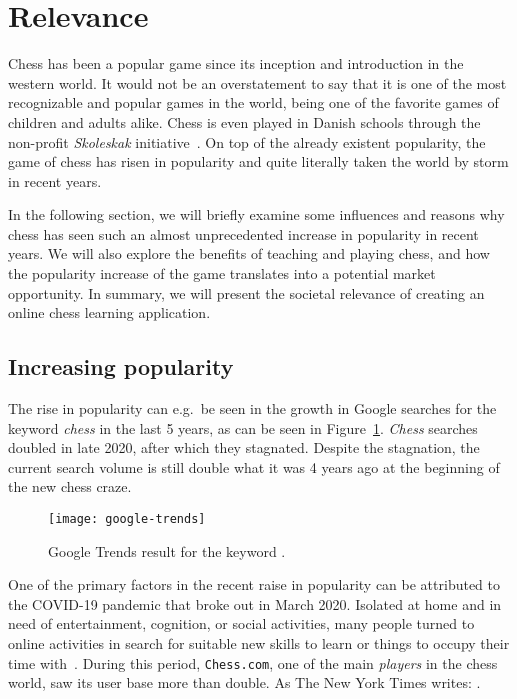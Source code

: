 \section{Relevance}\label{sec:relevance}

Chess has been a popular game since its inception and introduction in the western world.
It would not be an overstatement to say that it is one of the most recognizable and popular games in the world, being
one of the favorite games of children and adults alike.
Chess is even played in Danish schools through the non-profit \textit{Skoleskak} initiative~\cite{skoleskak2024}.
On top of the already existent popularity, the game of chess has risen in popularity and quite literally taken
the world by storm in recent years.

In the following section, we will briefly examine some influences and reasons why chess has seen such an almost
unprecedented increase in popularity in recent years.
We will also explore the benefits of teaching and playing chess, and how the popularity increase of the game translates
into a potential market opportunity.
In summary, we will present the societal relevance of creating an online chess learning application.

\subsection{Increasing popularity}\label{subsec:increasing-popularity}

The rise in popularity can e.g.\ be seen in the growth in Google searches for the keyword \textit{chess} in the last 5
years, as can be seen in Figure~\ref{fig:google-trends}.
\textit{Chess} searches doubled in late 2020, after which they stagnated.
Despite the stagnation, the current search volume is still double what it was 4 years ago at the beginning of the new
chess craze.

\begin{figure}
    \centering
    \texttt{[image: google-trends]}
    \caption{Google Trends result for the keyword .}\label{fig:google-trends}
\end{figure}

One of the primary factors in the recent raise in popularity can be attributed to the COVID-19 pandemic that broke out
in March 2020.
Isolated at home and in need of entertainment, cognition, or social activities, many people turned to online activities
in search for suitable new skills to learn or things to occupy their time with~\cite{nyt2022}.
During this period, \verb|Chess.com|, one of the main \textit{players} in the chess world, saw its user base more than
double.
As The New York Times writes: .

